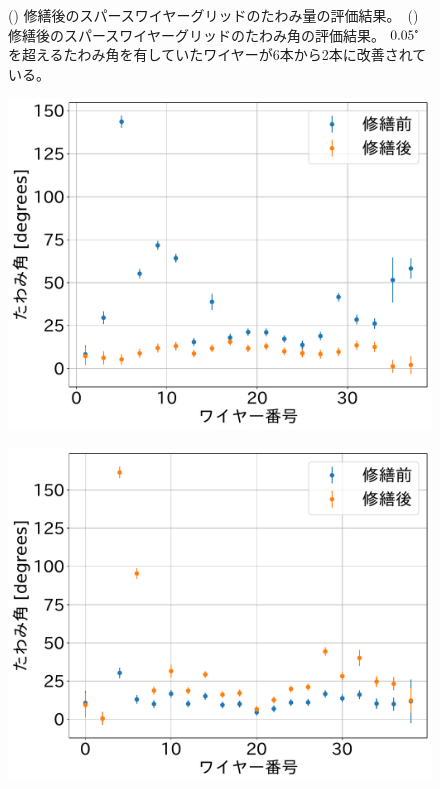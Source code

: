 \documentclass[../../main.tex]{subfiles}
\begin{document}
\begin{figure}[H]
\begin{minipage}[b]{0.5\hsize}
        \subcaption{}
        \label{fig:wiresag_swg_sag_angle_result_repair}
    \end{minipage}
    \caption{() 修繕後のスパースワイヤーグリッドのたわみ量の評価結果。\ 
             () 修繕後のスパースワイヤーグリッドのたわみ角の評価結果。
             $0.05\tcdegree$を超えるたわみ角を有していたワイヤーが6本から2本に改善されている。}
    \label{fig:wiresag_swg_result_repair}
\end{figure}
\begin{figure}[H]
    \begin{minipage}[b]{0.5\hsize}
        \centering
        \includegraphics[width=1.0\textwidth]{wiresag_swg/swg_sag_angle_odd_comparison.pdf}
        \subcaption{}
        \label{fig:wiresag_swg_sag_odd_comparison}
    \end{minipage}
    \begin{minipage}[b]{0.5\hsize}
        \centering
        \includegraphics[width=1.0\textwidth]{wiresag_swg/swg_sag_angle_even_comparison.pdf}

\end{minipage}
\end{figure}
\end{document}
